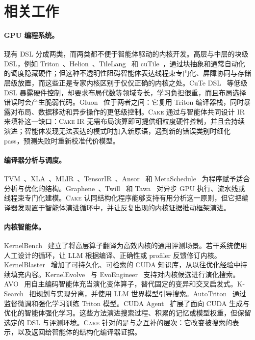 \documentclass[10pt]{article}
\newcommand{\cake}{\textsc{Cake}}
\newcommand{\cakeir}{\textsc{Cake IR}}
\begin{document}
\section{相关工作}
\label{sec:related}

\paragraph{GPU 编程系统。}
现有 DSL 分成两类，而两类都不便于智能体驱动的内核开发。高层与中层的块级 DSL，例如 Triton~\cite{tillet2019triton}、Helion~\cite{helion2026}、TileLang~\cite{ye2025tilelang} 和 cuTile~\cite{cutile2026}，通过块抽象和通常自动化的调度隐藏硬件；但这种不透明性阻碍智能体表达线程束专门化、屏障协同与存储层级放置，而这些正是专家内核区别于仅仅正确的内核之处。CuTe DSL~\cite{cutedsl2025} 等低级 DSL 暴露硬件控制，却要求布局代数等领域专长，学习负担很重，而且布局选择错误时会产生脆弱代码。Gluon~\cite{gluon2026} 位于两者之间：它复用 Triton 编译器栈，同时暴露对布局、数据移动和异步操作的更低级控制。\cake{} 通过与智能体共同设计 IR 来填补这一缺口：\cakeir{} 无需布局演算即可提供细粒度硬件控制，并且会持续演进；智能体发现无法表达的模式时加入新原语，遇到新的错误类别时细化 pass，预测失败时重新校准代价模型。

\paragraph{编译器分析与调度。}
TVM~\cite{chen2018tvm}、XLA~\cite{xla2017}、MLIR~\cite{lattner2021mlir}、TensorIR~\cite{feng2023tensorir}、Ansor~\cite{zheng2020ansor} 和 MetaSchedule~\cite{shao2022metaschedule} 为程序赋予适合分析与优化的结构。Graphene~\cite{hagedorn2023graphene,hagedorn2026time}、Twill~\cite{soi2024twill} 和 Tawa~\cite{chen2025tawa} 对异步 GPU 执行、流水线或线程束专门化建模。\cake{} 认同结构化程序能够支持有用分析这一原则，但它把编译器发现置于智能体演进循环中，并让反复出现的内核证据推动框架演进。

\paragraph{内核智能体。}
KernelBench~\cite{ouyang2024kernelbench} 建立了将高层算子翻译为高效内核的通用评测场景。若干系统使用人工设计的循环，让 LLM 根据编译、正确性或 profiler 反馈修订内核\cite{accelopt2025,autocomp2025,cheng2026kernelagent}。KernelBlaster~\cite{dong2026kernelblaster} 增加了可持久化、可检索的 CUDA 知识库，从以往优化经验中持续填充内容。KernelEvolve~\cite{liao2025kernelevolve} 与 EvoEngineer~\cite{guo2025evoengineermasteringautomatedcuda} 支持对内核候选进行演化搜索。AVO~\cite{chen2026avo} 用自主编码智能体充当演化变体算子，替代固定的变异和交叉启发式。K-Search~\cite{cao2026ksearch} 把规划与实现分离，并使用 LLM 世界模型引导搜索。AutoTriton~\cite{li2025autotriton} 通过监督微调和强化学习训练 Triton 模型。CUDA Agent~\cite{dai2026cudaagent} 扩展了面向 CUDA 生成与优化的智能体强化学习。这些方法演进搜索过程、积累的记忆或模型权重，但保留选定的 DSL 与评测环境。\cake{} 针对的是与之互补的层次：它改变被搜索的表示，以及返回给智能体的结构化编译器证据。
\end{document}
